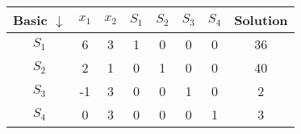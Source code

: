 \begin{center}
\begin{tabular}{|c|c|c|c|c|c|c|c|}
\hline
Basic $\downarrow$ & $x_1$ & $x_2$ & $S_1$ & $S_2$ & $S_3$ & $S_4$ & Solution \\
\hline
$S_1$ & 6  & 3 & 1 & 0 & 0 & 0 & 36 \\
\hline
$S_2$ & 2  & 1 & 0 & 1 & 0 & 0 & 40 \\
\hline
$S_3$ & -1 & 3 & 0 & 0 & 1 & 0 & 2  \\
\hline
$S_4$ & 0  & 3 & 0 & 0 & 0 & 1 & 3  \\
\hline
\end{tabular}
\end{center}